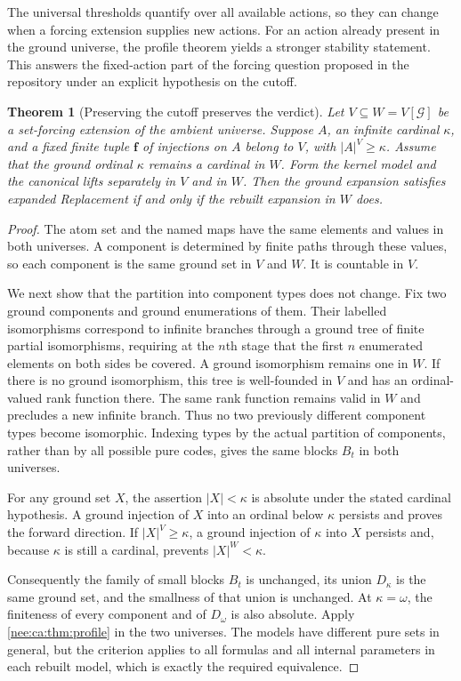 \documentclass[11pt,letterpaper]{article}
\numberwithin{equation}{section}
\theoremstyle{plain}
\newtheorem{theorem}{Theorem}[section]
\theoremstyle{definition}
\theoremstyle{remark}
\begin{document}
The universal thresholds quantify over all available actions, so they can change when a forcing extension supplies new actions. For an action already present in the ground universe, the profile theorem yields a stronger stability statement. This answers the fixed-action part of the forcing question proposed in the repository \cite[Question 10.10]{RepoNaming} under an explicit hypothesis on the cutoff.

\begin{theorem}[Preserving the cutoff preserves the verdict]\label{nee:ca:thm:forcing}
Let $V\subseteq W=V[\mathcal G]$ be a set-forcing extension of the ambient universe. Suppose $A$, an infinite cardinal $\kappa$, and a fixed finite tuple $\boldsymbol f$ of injections on $A$ belong to $V$, with $|A|^V\geq\kappa$. Assume that the ground ordinal $\kappa$ remains a cardinal in $W$. Form the kernel model and the canonical lifts separately in $V$ and in $W$. Then the ground expansion satisfies expanded Replacement if and only if the rebuilt expansion in $W$ does.
\end{theorem}
\begin{proof}
The atom set and the named maps have the same elements and values in both universes. A component is determined by finite paths through these values, so each component is the same ground set in $V$ and $W$. It is countable in $V$.

We next show that the partition into component types does not change. Fix two ground components and ground enumerations of them. Their labelled isomorphisms correspond to infinite branches through a ground tree of finite partial isomorphisms, requiring at the $n$th stage that the first $n$ enumerated elements on both sides be covered. A ground isomorphism remains one in $W$. If there is no ground isomorphism, this tree is well-founded in $V$ and has an ordinal-valued rank function there. The same rank function remains valid in $W$ and precludes a new infinite branch. Thus no two previously different component types become isomorphic. Indexing types by the actual partition of components, rather than by all possible pure codes, gives the same blocks $B_t$ in both universes.

For any ground set $X$, the assertion $|X|<\kappa$ is absolute under the stated cardinal hypothesis. A ground injection of $X$ into an ordinal below $\kappa$ persists and proves the forward direction. If $|X|^V\geq\kappa$, a ground injection of $\kappa$ into $X$ persists and, because $\kappa$ is still a cardinal, prevents $|X|^W<\kappa$.

Consequently the family of small blocks $B_t$ is unchanged, its union $D_\kappa$ is the same ground set, and the smallness of that union is unchanged. At $\kappa=\omega$, the finiteness of every component and of $D_\omega$ is also absolute. Apply \cref{nee:ca:thm:profile} in the two universes. The models have different pure sets in general, but the criterion applies to all formulas and all internal parameters in each rebuilt model, which is exactly the required equivalence.
\end{proof}
\end{document}
